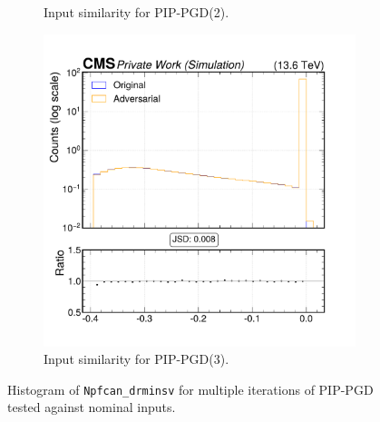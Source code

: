 \begin{figure}[htbp]
\begin{subfigure}[t]{0.32\textwidth}
    \caption*{Input similarity for PIP-PGD(2).}
  \end{subfigure}\hfill
  \begin{subfigure}[t]{0.32\textwidth}
    \includegraphics[width=\linewidth]{media/output/features/compare/combined_it_3/cmp_npf_arr_Npfcan_drminsv.pdf}
    \caption*{Input similarity for PIP-PGD(3).}
  \end{subfigure}

  \caption*{Histogram of \texttt{Npfcan\_drminsv} for multiple iterations of PIP-PGD tested against nominal inputs.}
  \label{fig:combined_input_Npfcan_drminsv}
\end{figure}

